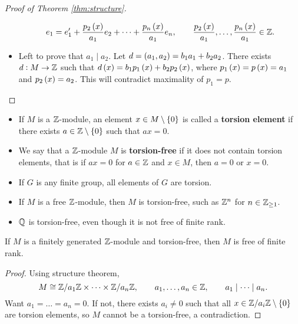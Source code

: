 \begin{proof}[Proof of Theorem \ref{thm:structure}]
\begin{itemize}
$$ e_1 = e_1' + \dfrac{p_2\br{x}}{a_1}e_2 + \dots + \dfrac{p_n\br{x}}{a_1}e_n, \qquad \dfrac{p_2\br{x}}{a_1}, \dots, \dfrac{p_n\br{x}}{a_1} \in \ZZ. $$
\item Left to prove that $ a_1 \mid a_2 $. Let $ d = \br{a_1, a_2} = b_1a_1 + b_2a_2 $. There exists $ d : M \to \mathbb{Z} $ such that $ d\br{x} = b_1p_1\br{x} + b_2p_2\br{x} $, where $ p_1\br{x} = p\br{x} = a_1 $ and $ p_2\br{x} = a_2 $. This will contradict maximality of $ p_1 = p $.
\end{itemize}
\end{proof}


\begin{definition}
\hfill
\begin{itemize}
\item If $ M $ is a $ \mathbb{Z} $-module, an element $ x \in M \setminus \cbr{0} $ is called a \textbf{torsion element} if there exists $ a \in \ZZ \setminus \cbr{0} $ such that $ ax = 0 $.
\item We say that a $ \mathbb{Z} $-module $ M $ is \textbf{torsion-free} if it does not contain torsion elements, that is if $ ax = 0 $ for $ a \in \mathbb{Z} $ and $ x \in M $, then $ a = 0 $ or $ x = 0 $.
\end{itemize}
\end{definition}

\begin{example*}
\hfill
\begin{itemize}
\item If $ G $ is any finite group, all elements of $ G $ are torsion.
\item If $ M $ is a free $ \mathbb{Z} $-module, then $ M $ is torsion-free, such as $ \mathbb{Z}^n $ for $ n \in \mathbb{Z}_{\ge 1} $.
\item $ \mathbb{Q} $ is torsion-free, even though it is not free of finite rank.
\end{itemize}
\end{example*}

\begin{proposition}
If $ M $ is a finitely generated $ \mathbb{Z} $-module and torsion-free, then $ M $ is free of finite rank.
\end{proposition}

\begin{proof}
Using structure theorem,
$$ M \cong \mathbb{Z} / a_1\mathbb{Z} \times \dots \times \mathbb{Z} / a_n\mathbb{Z}, \qquad a_1, \dots, a_n \in \mathbb{Z}, \qquad a_1 \mid \dots \mid a_n. $$
Want $ a_1 = \dots = a_n = 0 $. If not, there exists $ a_i \ne 0 $ such that all $ x \in \ZZ / a_i\ZZ \setminus \cbr{0} $ are torsion elements, so $ M $ cannot be a torsion-free, a contradiction.
\end{proof}


